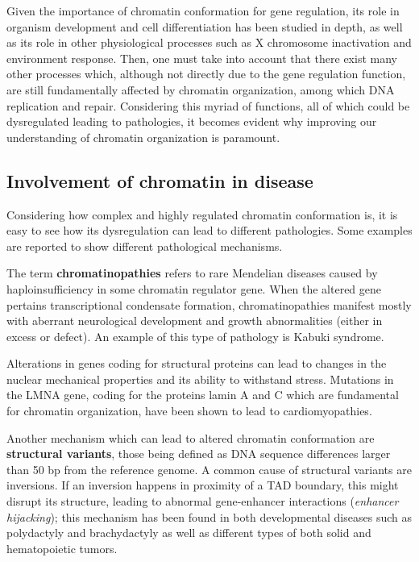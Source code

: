 Given the importance of chromatin conformation for gene regulation, its role in organism development and cell differentiation has been studied in depth\cite{chromatindevelopment2019}, as well as its role in other physiological processes such as X chromosome inactivation\cite{xsilencing2017} and environment response\cite{epigeneticsenvironment2019}. Then, one must take into account that there exist many other processes which, although not directly due to the gene regulation function, are still fundamentally affected by chromatin organization, among which DNA replication\cite{chromatinreplication2017} and repair\cite{chromatinrepair2017}. Considering this myriad of functions, all of which could be dysregulated leading to pathologies, it becomes evident why improving our understanding of chromatin organization is paramount.

\subsection{Involvement of chromatin in disease}
Considering how complex and highly regulated chromatin conformation is, it is easy to see how its dysregulation can lead to different pathologies. Some examples are reported to show different pathological mechanisms.

The term \textbf{chromatinopathies} refers to rare Mendelian diseases caused by haploinsufficiency in some chromatin regulator gene. When the altered gene pertains transcriptional condensate formation, chromatinopathies manifest mostly with aberrant neurological development and growth abnormalities (either in excess or defect). An example of this type of pathology is Kabuki syndrome\cite{condensates2023}.

Alterations in genes coding for structural proteins can lead to changes in the nuclear mechanical properties and its ability to withstand stress. Mutations in the LMNA gene, coding for the proteins lamin A and C which are fundamental for chromatin organization, have been shown to lead to cardiomyopathies\cite{chromatincardiomyopathy2021}. 

Another mechanism which can lead to altered chromatin conformation are \textbf{structural variants}, those being defined as DNA sequence differences larger than 50 bp from the reference genome\cite{sequencevariations2023}. A common cause of structural variants are inversions. If an inversion happens in proximity of a TAD boundary, this might disrupt its structure, leading to abnormal gene-enhancer interactions (\emph{enhancer hijacking}); this mechanism has been found in both developmental diseases such as polydactyly and brachydactyly\cite{epigeneticlimb2015} as well as different types of both solid and hematopoietic tumors\cite{chromatincancer2022, sequencevariations2023}.

